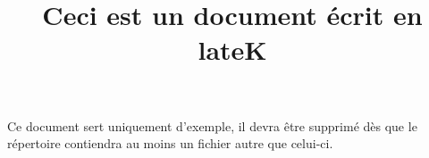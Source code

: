 \documentclass{article}
\title{Ceci est un document écrit en lateK}
\begin{document}
\maketitle

\large{
Ce document sert uniquement d'exemple, il devra être supprimé dès que le répertoire contiendra au moins un fichier autre que celui-ci.}
\end{document}
